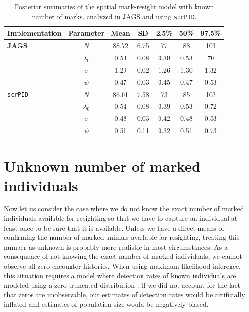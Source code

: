 \begin{table}
\label{partialID.tab.knownm}
\centering
  \caption{Posterior summaries of the spatial mark-resight model with known number of marks, analyzed in JAGS and using {\tt scrPID}.}
  \begin{tabular}{lcccccc}
             \hline
  Implementation & Parameter   & Mean  & SD   & 2.5\% & 50\% & 97.5\% \\
           \hline
{\bf JAGS}       & $N$         & 88.72 & 6.75 & 77    & 88   & 103    \\
		 & $\lambda_0$ & 0.53  & 0.08 & 0.39  & 0.53 & 70     \\
		 & $\sigma$    & 1.29  & 0.02 & 1.26  & 1.30 & 1.32   \\
		 & $\psi$      & 0.47  & 0.03 & 0.45  & 0.47 & 0.53   \\
		\hline
{\tt scrPID}     & $N$         & 86.01 & 7.58 & 73    & 85   & 102    \\
		 & $\lambda_0$ & 0.54  & 0.08 & 0.39  & 0.53 & 0.72   \\
		 & $\sigma$    & 0.48  & 0.03 & 0.42  & 0.48 & 0.53   \\
		 & $\psi$      & 0.51  & 0.11 & 0.32  & 0.51 & 0.73   \\
			\hline
  \end{tabular}
\end{table}


\section {Unknown number of marked individuals}
\label{partialID.sec.unknown}
Now let us consider the case where we do not know the exact number of
marked individuals available for resighting so that we have to capture
an individual at least once to be sure that it is available. Unless we
have a direct means of confirming the number of marked animals
available for resighting, treating this number as unknown is probably
more realistic
in most circumstances. As a consequence of not knowing the exact number of marked individuals, we cannot observe all-zero encounter histories. When using maximum likelihood inference, this situation requires a model where detection rates of known individuals are modeled using a zero-truncated distribution \citep{mcclintock_etal:2009biometrics}. If we did not account for the fact that zeros are unobservable, our estimates of detection rates would be artificially inflated and estimates of population size would be negatively biased.

